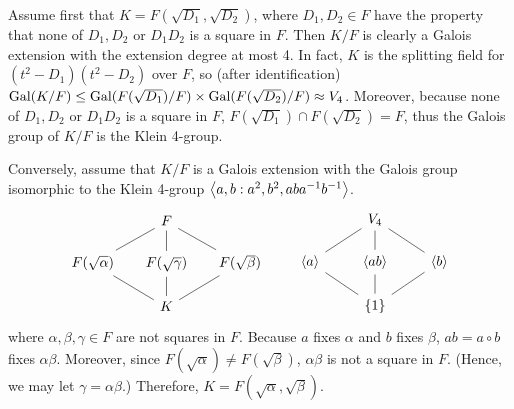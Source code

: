 \begin{sol}
    Assume first that $K=F(\sqrt{D_1}, \sqrt{D_2})$, where $D_1, D_2\in F$ have the property that none of $D_1, D_2$ or $D_1D_2$ is a square in $F$.
    Then $K/F$ is clearly a Galois extension with the extension degree at most 4.
    In fact, $K$ is the splitting field for $(t^2-D_1)(t^2-D_2)$ over $F$, so (after identification) ${\textrm{Gal}({K/F})}\leq{\textrm{Gal}({F(\sqrt{D_1})/F})}\times{\textrm{Gal}({F(\sqrt{D_2})/F})}\approx V_4$.
    Moreover, because none of $D_1, D_2$ or $D_1D_2$ is a square in $F$, $F(\sqrt{D_1})\cap F(\sqrt{D_2})=F$, thus the Galois group of $K/F$ is the Klein 4-group.

    Conversely, assume that $K/F$ is a Galois extension with the Galois group isomorphic to the Klein 4-group ${\left\langle{a, b: a^2, b^2, aba^{-1}b^{-1}}\right\rangle}$.
    \begin{equation*}
        \begin{tikzcd}[row sep=0.5cm, column sep=0.5cm]
            &
            F
                \arrow[dl, dash]
                \arrow[d, dash]
                \arrow[dr, dash]
            &
            \\
            F(\sqrt{\alpha})
                \arrow[dr, dash]
            &
            F(\sqrt{\gamma})
                \arrow[d, dash]
            &
            F(\sqrt{\beta})
                \arrow[dl, dash]
            \\
            &
            K
            &
        \end{tikzcd}
        \quad\quad
        \begin{tikzcd}[row sep=0.5cm, column sep=0.8cm]
            &
            V_4
                \arrow[dl, dash]
                \arrow[d, dash]
                \arrow[dr, dash]
            &
            \\
            \genone{a}
                \arrow[dr, dash]
            &
            \genone{ab}
                \arrow[d, dash]
            &
            \genone{b}
                \arrow[dl, dash]
            \\
            &
            \{1\}
            &
        \end{tikzcd}
    \end{equation*}
    where $\alpha, \beta, \gamma\in F$ are not squares in $F$.
    Because $a$ fixes $\alpha$ and $b$ fixes $\beta$, $ab=a\circ b$ fixes $\alpha\beta$.
    Moreover, since $F(\sqrt{\alpha})\neq F(\sqrt{\beta})$, $\alpha\beta$ is not a square in $F$.
    (Hence, we may let $\gamma=\alpha\beta$.)
    Therefore, $K=F(\sqrt{\alpha}, \sqrt{\beta})$.
\end{sol}